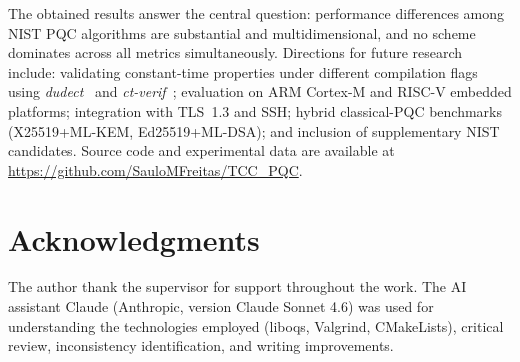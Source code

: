 \documentclass[12pt]{article}
\begin{document}
The obtained results answer the central question: performance differences
among NIST PQC algorithms are substantial and multidimensional, and no
scheme dominates across all metrics simultaneously. Directions for future
research include: validating constant-time properties under different
compilation flags using \textit{dudect}~\cite{Reparaz:2017} and
\textit{ct-verif}~\cite{Almeida:2016}; evaluation on ARM Cortex-M and
RISC-V embedded platforms; integration with TLS~1.3 and SSH; hybrid
classical-PQC benchmarks (X25519+ML-KEM, Ed25519+ML-DSA); and inclusion
of supplementary NIST candidates. Source code and experimental data are
available at \url{https://github.com/SauloMFreitas/TCC_PQC}.

\section*{Acknowledgments}
The author thank the supervisor for support throughout the work. The AI
assistant Claude (Anthropic, version Claude Sonnet 4.6) was used for
understanding the technologies employed (liboqs, Valgrind, CMakeLists),
critical review, inconsistency identification, and writing improvements.



\end{document}
